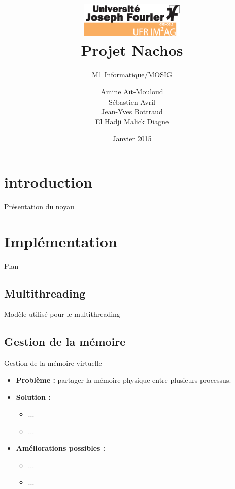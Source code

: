 \documentclass{beamer}
\title{\includegraphics[width=5cm]{LOGO_IM2AG_UJF.eps}
\\ Projet Nachos}
\subtitle{M1 Informatique/MOSIG}
\author{Amine Aït-Mouloud
\\ Sébastien Avril
\\ Jean-Yves Bottraud
\\ El Hadji Malick Diagne
}
\date{Janvier 2015}
\begin{document}
\frame{\titlepage} 

\begin{frame}
    \tableofcontents
\end{frame}

\section{introduction}
\begin{frame}{Présentation du noyau}
\end{frame}

\section{Implémentation}
\begin{frame}{Plan}
    \tableofcontents[currentsection]
\end{frame}

\subsection{Multithreading}
\begin{frame}{Modèle utilisé pour le multithreading}
   
\end{frame}


\subsection{Gestion de la mémoire}
\begin{frame}{Gestion de la mémoire virtuelle}
    \begin{itemize}
        \item \textbf{Problème :} partager la mémoire physique entre plusieurs processus.
        \item \textbf{Solution :}
            \begin{itemize}
                \item ...
                \item ...
            \end{itemize}
        \item \textbf{Améliorations possibles :}
            \begin{itemize}
                \item ...
                \item ...
            \end{itemize}
    \end{itemize}
\end{frame}
\end{document}
